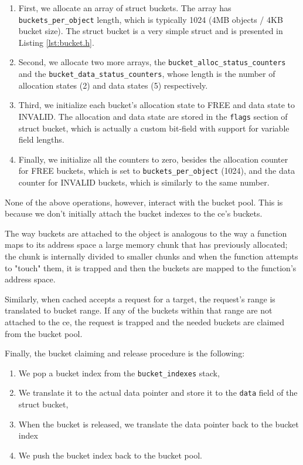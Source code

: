 \begin{enumerate}
	\item First, we allocate an array of struct buckets. The array has
		\texttt{buckets\_per\_object} length, which is typically 1024 
		(4MB objects / 4KB bucket size). The struct bucket is a very 
		simple struct and is presented in Listing 
		\ref{lst:bucket.h}.
		

	\item Second, we allocate two more arrays, the  
		\texttt{bucket\_alloc\_status\_counters} and the
		\texttt{bucket\_data\_status\_counters}, whose length is the 
		number of allocation states (2) and data states (5) 
		respectively.
	\item Third, we initialize each bucket's allocation state to FREE and 
		data state to INVALID. The allocation and data state are stored 
		in the \texttt{flags} section of struct bucket, which is 
		actually a custom bit-field with support for variable field 
		lengths.
	\item Finally, we initialize all the counters to zero, besides the 
		allocation counter for FREE buckets, which is set to 
		\texttt{buckets\_per\_object} (1024), and the data counter for 
		INVALID buckets, which is similarly to the same number.
\end{enumerate}

None of the above operations, however, interact with the bucket pool. This is 
because we don't initially attach the bucket indexes to the ce's buckets.

The way buckets are attached to the object is analogous to the way a function 
maps to its address space a large memory chunk that has previously allocated; 
the chunk is internally divided to smaller chunks and when the function 
attempts to "touch" them, it is trapped and then the buckets are mapped to the 
function's address space.

Similarly, when cached accepts a request for a target, the request's range is 
translated to bucket range. If any of the buckets within that range are not 
attached to the ce, the request is trapped and the needed buckets are claimed 
from the bucket pool.

Finally, the bucket claiming and release procedure is the following:
\begin{enumerate}
\item We pop a bucket index from the \texttt{bucket\_indexes} stack,
\item We translate it to the actual data pointer and store it to the 
	\texttt{data} field of the struct bucket,
\item When the bucket is released, we translate the data pointer back to the 
	bucket index
\item We push the bucket index back to the bucket pool.
\end{enumerate}

